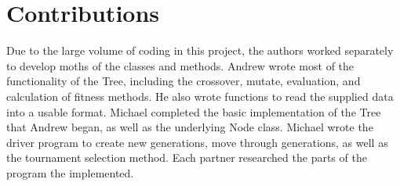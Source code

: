 
\section{Contributions}
\label{sec:contrib}

Due to the large volume of coding in this project, the authors worked separately to develop moths of the classes and methods. Andrew wrote most of the functionality of the Tree, including the crossover, mutate, evaluation, and calculation of fitness methods. He also wrote functions to read the supplied data into a usable format.  Michael completed the basic implementation of the Tree that Andrew began, as well as the underlying Node class. Michael wrote the driver program to create new generations, move through generations, as well as the tournament selection method. Each partner researched the parts of the program the implemented.
